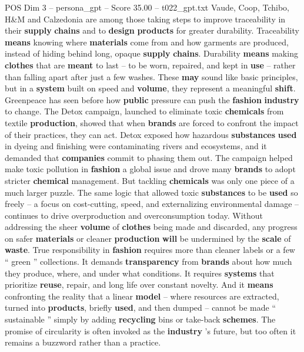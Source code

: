 \begin{textsample}{POS Dim 3 – persona\_gpt – Score 35.00 – t022\_gpt.txt}
Vaude, Coop, Tchibo, H\&M and Calzedonia are among those taking steps to improve traceability in their \textbf{supply} \textbf{chains} and to \textbf{design} \textbf{products} for greater durability.
Traceability \textbf{means} knowing where \textbf{materials} come from and how garments are produced, instead of hiding behind long, opaque \textbf{supply} \textbf{chains}.
Durability \textbf{means} making \textbf{clothes} that are \textbf{meant} to last – to be worn, repaired, and kept in \textbf{use} – rather than falling apart after just a few washes.
These \textbf{may} sound like basic principles, but in a \textbf{system} built on speed and \textbf{volume}, they represent a meaningful \textbf{shift}.
Greenpeace has seen before how \textbf{public} pressure can push the \textbf{fashion} \textbf{industry} to change.
The Detox campaign, launched to eliminate toxic \textbf{chemicals} from textile \textbf{production}, showed that when \textbf{brands} are forced to confront the impact of their practices, they can act.
Detox exposed how hazardous \textbf{substances} \textbf{used} in dyeing and finishing were contaminating rivers and ecosystems, and it demanded that \textbf{companies} commit to phasing them out.
The campaign helped make toxic pollution in \textbf{fashion} a global issue and drove many \textbf{brands} to adopt stricter \textbf{chemical} management.
But tackling \textbf{chemicals} was only one piece of a much larger puzzle.
The same logic that allowed toxic \textbf{substances} to be \textbf{used} so freely – a focus on cost-cutting, speed, and externalizing environmental damage – continues to drive overproduction and overconsumption today.
Without addressing the sheer \textbf{volume} of \textbf{clothes} being made and discarded, any progress on safer \textbf{materials} or cleaner \textbf{production} \textbf{will} be undermined by the \textbf{scale} of \textbf{waste}.
True responsibility in \textbf{fashion} requires more than cleaner labels or a few “ green ” collections.
It demands \textbf{transparency} from \textbf{brands} about how much they produce, where, and under what conditions.
It requires \textbf{systems} that prioritize \textbf{reuse}, repair, and long life over constant novelty.
And it \textbf{means} confronting the reality that a linear \textbf{model} – where resources are extracted, turned into \textbf{products}, briefly \textbf{used}, and then dumped – cannot be made “ sustainable ” simply by adding \textbf{recycling} bins or take-back \textbf{schemes}.
The promise of circularity is often invoked as the \textbf{industry} ’s future, but too often it remains a buzzword rather than a practice.

\end{textsample}
